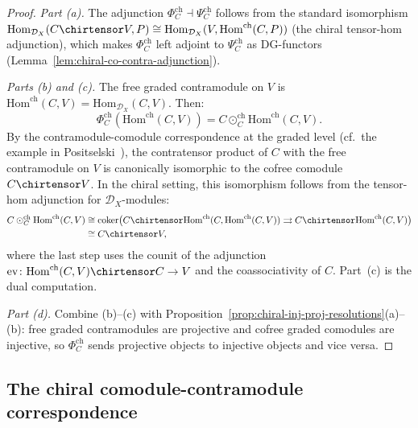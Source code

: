 \begin{proof}
\emph{Part (a).}
The adjunction $\Phi_C^{\mathrm{ch}} \dashv \Psi_C^{\mathrm{ch}}$
follows from the standard isomorphism
$\mathrm{Hom}_{\mathcal{D}_X}(C \chirtensor V, P)
\cong \mathrm{Hom}_{\mathcal{D}_X}(V, \mathrm{Hom}^{\mathrm{ch}}(C, P))$
(the chiral tensor-hom adjunction), which makes
$\Phi_C^{\mathrm{ch}}$ left adjoint to $\Psi_C^{\mathrm{ch}}$ as
DG-functors (Lemma~\ref{lem:chiral-co-contra-adjunction}).

\emph{Parts (b) and (c).}
The free graded contramodule on $V$ is
$\mathrm{Hom}^{\mathrm{ch}}(C, V) = \mathrm{Hom}_{\mathcal{D}_X}(C, V)$.
Then:
\[
\Phi_C^{\mathrm{ch}}(\mathrm{Hom}^{\mathrm{ch}}(C, V))
= C \odot_C^{\mathrm{ch}} \mathrm{Hom}^{\mathrm{ch}}(C, V).
\]
By the contramodule-comodule correspondence at the graded level
(cf.\ the example in
Positselski~\cite[\S5.1]{Positselski11}), the
contratensor product of $C$ with the free contramodule on $V$ is
canonically isomorphic to the cofree comodule $C \chirtensor V$.
In the chiral setting, this isomorphism follows from the
tensor-hom adjunction for $\mathcal{D}_X$-modules:
\begin{align*}
C \odot_C^{\mathrm{ch}} \mathrm{Hom}^{\mathrm{ch}}(C, V)
&\cong \mathrm{coker}\bigl(
C \chirtensor \mathrm{Hom}^{\mathrm{ch}}(C, \mathrm{Hom}^{\mathrm{ch}}(C, V))
\rightrightarrows C \chirtensor \mathrm{Hom}^{\mathrm{ch}}(C, V)
\bigr) \\
&\cong C \chirtensor V,
\end{align*}
where the last step uses the counit of the adjunction
$\mathrm{ev}\colon \mathrm{Hom}^{\mathrm{ch}}(C, V) \chirtensor C
\to V$ and the coassociativity of $C$.  Part~(c) is the dual computation.

\emph{Part (d).}
Combine (b)--(c) with
Proposition~\ref{prop:chiral-inj-proj-resolutions}(a)--(b):
free graded contramodules are projective and cofree graded comodules
are injective, so $\Phi_C^{\mathrm{ch}}$ sends projective objects
to injective objects and vice versa.
\end{proof}

\subsection{The chiral comodule-contramodule correspondence}
\label{subsec:chiral-co-contra-correspondence}

